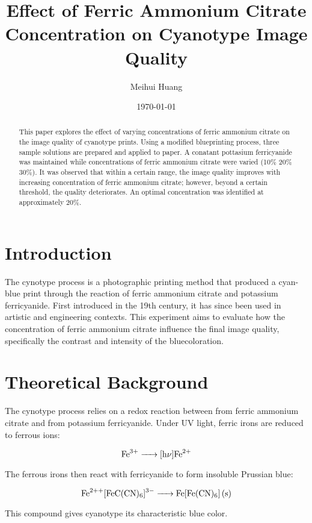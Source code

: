 \documentclass[a4paper,12pt]{article}
\title{Effect of Ferric Ammonium Citrate Concentration on Cyanotype Image Quality}
\author{Meihui Huang}
\date{\today}
\begin{document}
\maketitle

\begin{abstract}
This paper explores the effect of varying concentrations of ferric ammonium citrate on the image quality of cyanotype prints. Using a modified blueprinting process, three sample solutions are prepared and applied to paper. A conatant pottasium ferricyanide was maintained while concentrations of ferric ammonium citrate were varied (10\% 20\% 30\%). It was observed that within a certain range, the image quality improves with increasing concentration of ferric ammonium citrate; however, beyond a certain threshold, the quality deteriorates. An optimal concentration was identified at approximately 20\%.
\end{abstract}

\section{Introduction}
The cynotype process is a photographic printing method that produced a cyan-blue print through the reaction of ferric ammonium citrate and potassium ferricyanide. First introduced in the 19th century, it has since been used in artistic and engineering contexts. This experiment aims to evaluate how the concentration of ferric ammonium citrate influence the final image quality, specifically the contrast and intensity of the bluecoloration.

\section{Theoretical Background}
The cynotype process relies on a redox reaction between  from ferric ammonium citrate and  from potassium ferricyanide. Under UV light, ferric irons are reduced to ferrous ions:

\begin{equation}
\ce{Fe^{3+} -> [h\nu]Fe^{2+}}
\end{equation}

The ferrous irons then react with ferricyanide to form insoluble Prussian blue:

\begin{equation}
\ce{Fe^{2+}+[FeC(CN)6]^{3-} -> Fe[Fe(CN)6] (s)} 
\end{equation}

This compound gives cyanotype its characteristic blue color.
\end{document}
